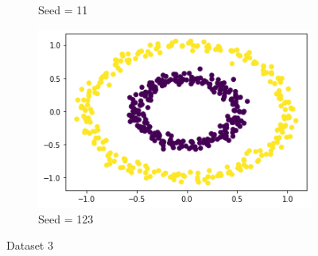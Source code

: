 \documentclass[12pt, fleqn]{article}
\begin{document}
\begin{figure}[H]
\begin{subfigure}[H]{0.35\textwidth}
        \caption[]{Seed = 11}
    \end{subfigure}
    \begin{subfigure}[H]{0.35\textwidth}
        \centering
        \includegraphics[width=\textwidth]{plots/D3/K123.png}
        \caption[]{Seed = 123}
    \end{subfigure}
    \caption[]{Dataset 3}
\end{figure}
\end{document}
